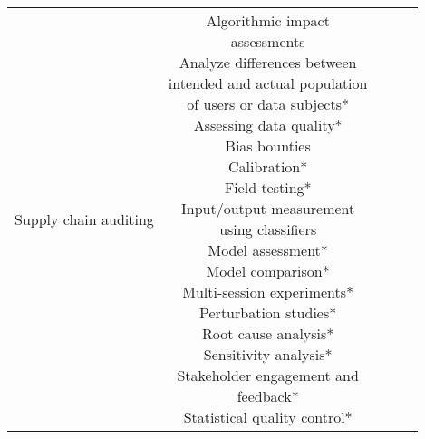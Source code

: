 \documentclass[fleqn]{article}
\begin{document}
\begin{landscape}
\begin{table}[H]
\begin{tabular}{|c|c|c|c|c|}
{			\textbullet\hspace{3pt} Supply chain auditing \\
		} 
		& \makecell[l]{
			\textbullet\hspace{3pt} Algorithmic impact\\\hspace{10pt}assessments\\  	
			\textbullet\hspace{3pt} Analyze differences between\\\hspace{10pt}intended and actual population\\\hspace{10pt}of users or data subjects*\\ 			
			\textbullet\hspace{3pt} Assessing data quality*\\  		
			\textbullet\hspace{3pt} Bias bounties\\  	
			\textbullet\hspace{3pt} Calibration*\\  	
			\textbullet\hspace{3pt} Field testing*\\  	
			\textbullet\hspace{3pt} Input/output measurement\\\hspace{10pt}using classifiers \\ 
			\textbullet\hspace{3pt} Model assessment*\\  	
			\textbullet\hspace{3pt} Model comparison*\\  	
			\textbullet\hspace{3pt} Multi-session experiments*\\  		
			\textbullet\hspace{3pt} Perturbation studies*\\  				
			\textbullet\hspace{3pt} Root cause analysis*\\  	
			\textbullet\hspace{3pt} Sensitivity analysis*\\  	
			\textbullet\hspace{3pt} Stakeholder engagement and \\\hspace{10pt}feedback*\\  	
			\textbullet\hspace{3pt} Statistical quality control*\\  	
}
\end{tabular}
\end{table}
\end{landscape}
\end{document}
